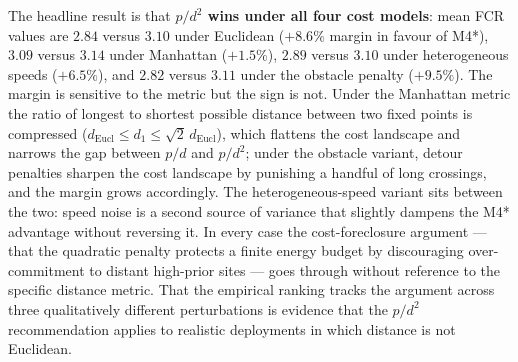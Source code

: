 The headline result is that \textbf{$p/d^2$ wins under all four cost
models}: mean FCR values are $2.84$ versus $3.10$ under Euclidean
($+8.6\%$ margin in favour of M4*), $3.09$ versus $3.14$ under
Manhattan ($+1.5\%$), $2.89$ versus $3.10$ under heterogeneous
speeds ($+6.5\%$), and $2.82$ versus $3.11$ under the obstacle
penalty ($+9.5\%$). The margin is sensitive to the metric but the
sign is not. Under the Manhattan metric the ratio of longest to
shortest possible distance between two fixed points is compressed
($d_{\mathrm{Eucl}} \leq d_1 \leq \sqrt{2}\,d_{\mathrm{Eucl}}$),
which flattens the cost landscape and narrows the gap between
$p/d$ and $p/d^2$; under the obstacle variant, detour penalties
sharpen the cost landscape by punishing a handful of long crossings,
and the margin grows accordingly. The heterogeneous-speed variant
sits between the two: speed noise is a second source of variance
that slightly dampens the M4* advantage without reversing it. In
every case the cost-foreclosure argument --- that the quadratic
penalty protects a finite energy budget by discouraging
over-commitment to distant high-prior sites --- goes through without
reference to the specific distance metric. That the empirical
ranking tracks the argument across three qualitatively different
perturbations is evidence that the $p/d^2$ recommendation applies
to realistic deployments in which distance is not Euclidean.
